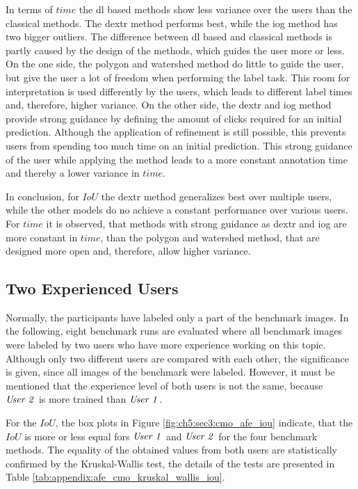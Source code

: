 In terms of $ time $ the \gls{dl} based methods show less variance over the users than the classical methods.
The \gls{dextr} method performs best, while the \gls{iog} method has two bigger outliers.
The difference between \gls{dl} based and classical methods is partly caused by the design of the methods, which guides the user more or less.
On the one side, the polygon and watershed method do little to guide the user,
but give the user a lot of freedom when performing the label task.
This room for interpretation is used differently by the users, which leads to different label times and, therefore, higher variance.
On the other side, the \gls{dextr} and \gls{iog} method provide strong guidance by defining the amount of clicks required for an initial prediction.
Although the application of refinement is still possible, this prevents users from spending too much time on an initial prediction.
This strong guidance of the user while applying the method leads to a more constant annotation time and thereby a lower variance in $ time $.

In conclusion, for $IoU$ the \gls{dextr} method generalizes best over multiple users, while the other models do no achieve a constant performance over various users.
For $ time $ it is observed, that methods with strong guidance as \gls{dextr} and \gls{iog} are more constant in $ time $, than the polygon and watershed method, that are designed more open and, therefore, allow higher variance.


\subsection{Two Experienced Users} \label{ord:ch5:sec3:subsec2_cmo_afe}

Normally, the participants have labeled only a part of the benchmark images. 
In the following, eight benchmark runs are evaluated where all benchmark images were labeled by two users who have more experience working on this topic.
Although only two different users are compared with each other, the significance is given, since all images of the benchmark were labeled.
However, it must be mentioned that the experience level of both users is not the same, because $ \textnormal{\textit{User 2}} $ is more trained than $ \textnormal{\textit{User 1}} $.

For the $ IoU $, the box plots in Figure \ref{fig:ch5:sec3:cmo_afe_iou} indicate, that the $ IoU $ is more or less equal fors $ \textnormal{\textit{User 1}} $ and $ \textnormal{\textit{User 2}} $ for the four benchmark methods.
The equality of the obtained values from both users are statistically confirmed by the Kruskal-Wallis test, the details of the tests are presented in Table \ref{tab:appendix:afe_cmo_kruskal_wallis_iou}.

